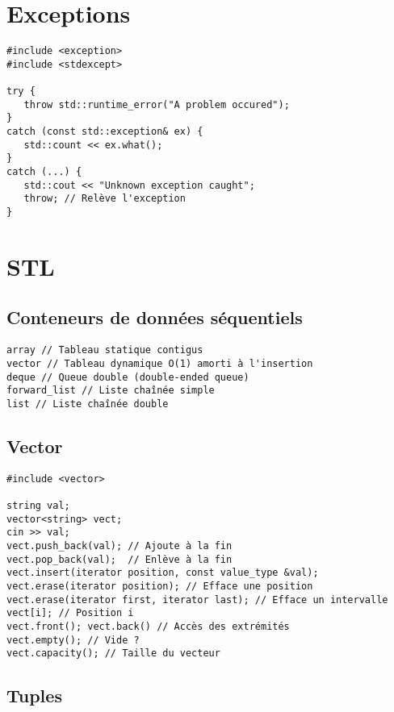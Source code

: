 \documentclass{article}
\begin{document}
\begin{multicols*}{3}
\begin{lstlisting}
\end{lstlisting}

\section*{Exceptions}

\begin{lstlisting}
#include <exception>
#include <stdexcept>

try {
   throw std::runtime_error("A problem occured");
}
catch (const std::exception& ex) {
   std::count << ex.what();
}
catch (...) {
   std::cout << "Unknown exception caught";
   throw; // Relève l'exception
}
\end{lstlisting}

\section*{STL}

\subsection*{Conteneurs de données séquentiels}

\begin{lstlisting}
array // Tableau statique contigus
vector // Tableau dynamique O(1) amorti à l'insertion
deque // Queue double (double-ended queue)
forward_list // Liste chaînée simple
list // Liste chaînée double
\end{lstlisting}

\subsection*{Vector}

\begin{lstlisting}
#include <vector>

string val;
vector<string> vect;
cin >> val;
vect.push_back(val); // Ajoute à la fin
vect.pop_back(val);  // Enlève à la fin
vect.insert(iterator position, const value_type &val);
vect.erase(iterator position); // Efface une position
vect.erase(iterator first, iterator last); // Efface un intervalle
vect[i]; // Position i
vect.front(); vect.back() // Accès des extrémités
vect.empty(); // Vide ?
vect.capacity(); // Taille du vecteur

\end{lstlisting}

\subsection*{Tuples}


\end{multicols*}
\end{document}
